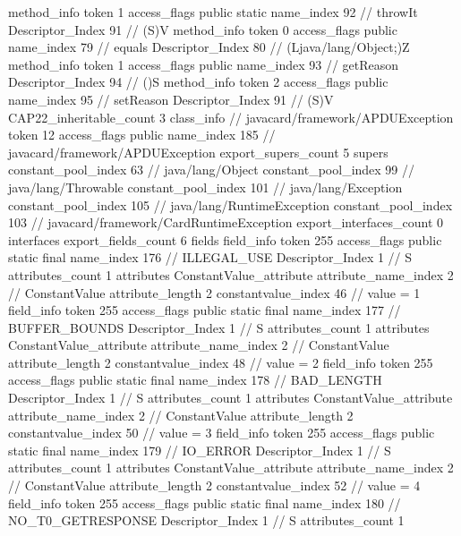 {{{{{				}
				method_info {
					token	1
					access_flags	public static
					name_index	92		// throwIt
					Descriptor_Index	91		// (S)V
				}
				method_info {
					token	0
					access_flags	public
					name_index	79		// equals
					Descriptor_Index	80		// (Ljava/lang/Object;)Z
				}
				method_info {
					token	1
					access_flags	public
					name_index	93		// getReason
					Descriptor_Index	94		// ()S
				}
				method_info {
					token	2
					access_flags	public
					name_index	95		// setReason
					Descriptor_Index	91		// (S)V
				}
			}
			CAP22_inheritable_count	3
		}
		class_info {		// javacard/framework/APDUException
			token	12
			access_flags	public
			name_index	185		// javacard/framework/APDUException
			export_supers_count	5
			supers {
				constant_pool_index	63		// java/lang/Object
				constant_pool_index	99		// java/lang/Throwable
				constant_pool_index	101		// java/lang/Exception
				constant_pool_index	105		// java/lang/RuntimeException
				constant_pool_index	103		// javacard/framework/CardRuntimeException
			}
			export_interfaces_count	0
			interfaces {
			}
			export_fields_count	6
			fields {
			field_info {
				token	255
				access_flags	public static final
				name_index	176		// ILLEGAL_USE
				Descriptor_Index	1		// S
				attributes_count	1
				attributes {
				ConstantValue_attribute {
					attribute_name_index	2		// ConstantValue
					attribute_length	2
					constantvalue_index	46		// value = 1
				}
				}
			}
			field_info {
				token	255
				access_flags	public static final
				name_index	177		// BUFFER_BOUNDS
				Descriptor_Index	1		// S
				attributes_count	1
				attributes {
				ConstantValue_attribute {
					attribute_name_index	2		// ConstantValue
					attribute_length	2
					constantvalue_index	48		// value = 2
				}
				}
			}
			field_info {
				token	255
				access_flags	public static final
				name_index	178		// BAD_LENGTH
				Descriptor_Index	1		// S
				attributes_count	1
				attributes {
				ConstantValue_attribute {
					attribute_name_index	2		// ConstantValue
					attribute_length	2
					constantvalue_index	50		// value = 3
				}
				}
			}
			field_info {
				token	255
				access_flags	public static final
				name_index	179		// IO_ERROR
				Descriptor_Index	1		// S
				attributes_count	1
				attributes {
				ConstantValue_attribute {
					attribute_name_index	2		// ConstantValue
					attribute_length	2
					constantvalue_index	52		// value = 4
				}
				}
			}
			field_info {
				token	255
				access_flags	public static final
				name_index	180		// NO_T0_GETRESPONSE
				Descriptor_Index	1		// S
				attributes_count	1
}}}}}
